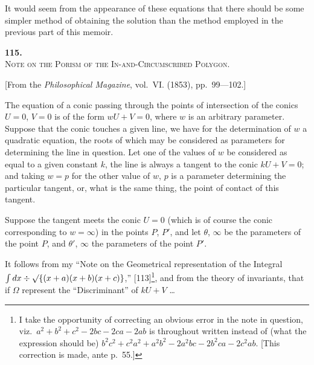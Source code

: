 \documentclass[11pt,a4paper]{book}
\begin{document}
It would seem from the appearance of these equations that there should be some simpler method of obtaining the solution than the method employed in the previous part of this memoir.


\newpage
\setcounter{page}{87}

\begin{center}
{\Large\bfseries 115.}\\[0.5em]
{\large\scshape Note on the Porism of the In-and-Circumscribed Polygon.}
\end{center}
\vspace{0.3em}
\begin{center}
\small [From the \textit{Philosophical Magazine}, vol.~VI. (1853), pp.~99---102.]
\end{center}
\vspace{0.5em}

The equation of a conic passing through the points of intersection of the conics $U=0$, $V=0$ is of the form $wU+V=0$, where $w$ is an arbitrary parameter. Suppose that the conic touches a given line, we have for the determination of $w$ a quadratic equation, the roots of which may be considered as parameters for determining the line in question. Let one of the values of $w$ be considered as equal to a given constant $k$, the line is always a tangent to the conic $kU+V=0$; and taking $w=p$ for the other value of $w$, $p$ is a parameter determining the particular tangent, or, what is the same thing, the point of contact of this tangent.

Suppose the tangent meets the conic $U=0$ (which is of course the conic corresponding to $w=\infty$) in the points $P$, $P'$, and let $\theta$, $\infty$ be the parameters of the point $P$, and $\theta'$, $\infty$ the parameters of the point $P'$.

It follows from my ``Note on the Geometrical representation of the Integral $\int dx\div\surd\{(x+a)(x+b)(x+c)\}$,'' [113]\footnote{I take the opportunity of correcting an obvious error in the note in question, viz.\ $a^2+b^2+c^2-2bc-2ca-2ab$ is throughout written instead of (what the expression should be) $b^2c^2+c^2a^2+a^2b^2-2a^2bc-2b^2ca-2c^2ab$. [This correction is made, ante p.~55.]}, and from the theory of invariants, that if $\Omega$ represent the ``Discriminant'' of $kU+V$ \ldots
\clearpage


\end{document}
